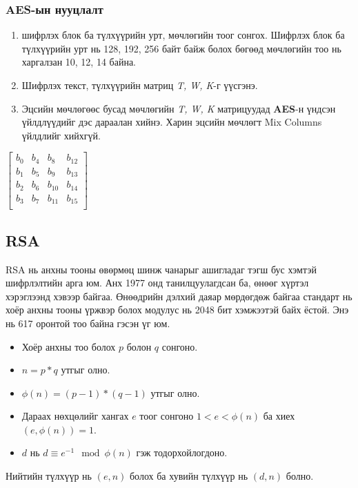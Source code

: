	\subsubsection{AES-ын нууцлалт}
	\begin{enumerate}
		\item шифрлэх блок ба түлхүүрийн урт, мөчлөгийн тоог сонгох. Шифрлэх блок ба түлхүүрийн урт нь 128, 192, 256 байт байж болох бөгөөд мөчлөгийн тоо нь харгалзан 10, 12, 14 байна.
		\item Шифрлэх текст, түлхүүрийн матриц \textit{T, W, K}-г үүсгэнэ.
		\item Эцсийн мөчлөгөөс бусад мөчлөгийн \textit{T, W, K} матрицуудад \textbf{AES}-н үндсэн үйлдлүүдийг дэс дараалан хийнэ. Харин эцсийн мөчлөгт Mix Columns үйлдлийг хийхгүй.
	\end{enumerate}
	\begin{center}
		$\begin{bmatrix}
				b_{0} & b_{4} & b_{8}  & b_{12} \\
				b_{1} & b_{5} & b_{9}  & b_{13} \\
				b_{2} & b_{6} & b_{10} & b_{14} \\
				b_{3} & b_{7} & b_{11} & b_{15} \\
			\end{bmatrix}$
	\end{center}
	\subsection{RSA}
	RSA нь анхны тооны өвөрмөц шинж чанарыг ашигладаг тэгш бус хэмтэй шифрлэлтийн арга юм. Анх 1977 онд танилцуулагдсан ба, өнөөг хүртэл хэрэглээнд хэвээр байгаа. Өнөөдрийн дэлхий даяар мөрдөгдөж байгаа стандарт нь хоёр анхны тооны үржвэр болох модулус нь 2048 бит хэмжээтэй байх ёстой. Энэ нь 617 оронтой тоо байна гэсэн үг юм.
	\begin{itemize}
		\item Хоёр анхны тоо болох $p$ болон $q$ сонгоно.
		\item $n = p*q$ утгыг олно.
		\item $\phi(n) = (p-1)*(q-1)$ утгыг олно.
		\item Дараах нөхцөлийг хангах $e$ тоог сонгоно $1 < e < \phi(n)$ ба хиех$(e, \phi(n)) = 1$.
		\item $d$ нь $d \equiv e^{-1} \mod \phi(n)$ гэж тодорхойлогдоно.
	\end{itemize}

	Нийтийн түлхүүр нь $(e, n)$ болох ба хувийн түлхүүр нь $(d, n)$ болно.\cite{RSA}